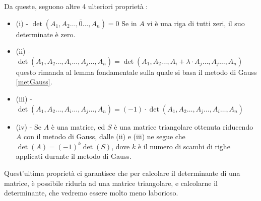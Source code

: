 \documentclass[12pt, letterpaper]{article}
\begin{document}
Da queste, seguono altre 4 ulteriori proprietà :\begin{itemize}
    \item (i) - \(\det(A_1,A_2\dots,\bar 0\dots,A_n)=0\) Se in \(A\) vi è una riga di tutti zeri, il suo determinate è zero.
    \item (ii) - \(\det(A_1,A_2\dots, A_i\dots,A_j\dots,A_n)=\det(A_1,A_2\dots, A_i+\lambda\cdot A_j\dots,A_j\dots,A_n)\) questo 
    rimanda al lemma fondamentale sulla quale si basa il metodo di Gauss \ref{metGauss}.
    \item (iii) - \(\det(A_1,A_2\dots, A_i\dots,A_j\dots,A_n)=(-1)\cdot\det(A_1,A_2\dots, A_j\dots,A_i\dots,A_n)\)
    \item (iv) - Se \(A\) è una matrice, ed \(S\) è una matrice triangolare ottenuta riducendo \(A\) con il metodo 
    di Gauss, dalle (ii) e (iii) ne segue che \(\det(A)=(-1)^k\det(S)\), dove \(k\) è il numero di scambi di righe 
    applicati durante il metodo di Gauss.
\end{itemize}
Quest'ultima proprietà ci garantisce che per calcolare il determinante di una matrice, è possibile ridurla ad una 
matrice triangolare, e calcolarne il determinante, che vedremo essere molto meno laborioso.
\end{document}
